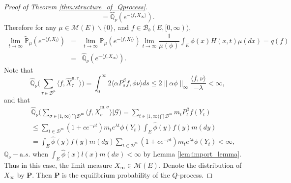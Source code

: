\documentclass[12pt,a4paper]{amsart}
\numberwithin{equation}{section}
\theoremstyle{plain}
\theoremstyle{definition}
\begin{document}
\begin{proof}[Proof of Theorem \ref{thm:structure_of_Qprocess}]
\begin{equation*}
    =\widehat{\mathbb Q}_{\nu}\left(e^{-\langle f, X_{\infty}\rangle }\right).
  \end{equation*}
  Therefore for any $\mu\in\mathcal M(E)\backslash\{0\}$, and $f\in\mathcal B_b(E,[0,\infty))$,
  \begin{eqnarray*}
    \lim_{t\rightarrow\infty}\widetilde{\mathbb P}_\mu\left(e^{-\langle f, X_t\rangle}\right)&=&\lim_{t\rightarrow\infty}\mathbb P_\mu\left(e^{-\langle f, X_t\rangle}\right)
                                                                                                 \lim_{t\to\infty}\dfrac{1}{\mu(\phi)}\int_E\phi(x)H(x, t)\mu(dx)=q(f)\\
                                                                                             &=&\widehat{\mathbb Q}_{\nu}\left(e^{-\langle f, X_{\infty}\rangle }\right).
  \end{eqnarray*}
  Note that
  \[
    \widehat{\mathbb Q}_{\nu}\big(\sum_{\tau\in \mathcal D^{\mathrm n}}\langle f, \widehat X_{\tau}^{{\mathrm n},\tau} \rangle \big)=\int_0^\infty2\langle \alpha P^{\beta}_sf,\phi\nu\rangle ds
    \leq 2\|\alpha\phi\|_\infty\dfrac{\langle f,\nu\rangle }{-\lambda}<\infty,
  \]
  and that
  \begin{eqnarray*}
    &&\widehat{\mathbb Q}_{\nu}\Big(\sum_{\sigma\in [1,\infty)\bigcap\mathcal D^{\mathrm m}}\langle f, \widehat X_{\sigma}^{{\mathrm m},\sigma} \rangle|\mathcal G \Big)
       =\sum_{t\in [1,\infty)\bigcap\mathcal D^{\mathrm m}}m_tP^{\beta}_tf( Y_t)\\
    &&\leq \sum_{t\in \mathcal D^{\mathrm m}}(1+ce^{-\rho t})m_te^{\lambda t}
       \phi(Y_t)\int_E\widehat\phi(y)f(y)m(dy)\\
    &&=\int_E\widehat\phi(y)f(y)m(dy) \sum_{t\in \mathcal D^{\mathrm m}}(1+ce^{-\rho t})m_te^{\lambda t}\phi(Y_t)<\infty,
  \end{eqnarray*}
  $\mathbb Q_{\nu}-{\mathrm a.s.}$ when $\int_E\widehat\phi(x)l(x)m(dx)<\infty$ by Lemma \ref{lem:import_lemma}.
  Thus in this case, the limit measure $X_\infty\in \mathcal M(E)$.  Denote the distribution of $X_\infty$ by $\mathbf P$.  Then $\mathbf P$
  is the equilibrium probability of the $Q$-process.



\end{proof}
\end{document}
